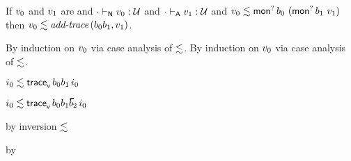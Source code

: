 \begin{lemma}\label{A-moptmopt-bnd}
  If\/ $v_0$ and\/ $v_1$ are \reducedsurfaceexpressions{}
  and\/ ${\cdot} \vdash_{\mathsf{N}} v_0 : {\mathcal U}$
  and\/ ${\cdot} \vdash_{\mathsf{A}} v_1 : {\mathcal U}$
  and\/ $v_0 \lesssim \mathsf{mon}^{?}\,b_0~(\mathsf{mon}^{?}\,b_1~v_1)$
  then\/ $v_0 \lesssim \textit{add\textsf{-}trace}\,(b_0  b_1, v_1)$.
\end{lemma}{
  \newcommand{\shortpf}{By induction on $\svalue_0$ via case analysis of $\srexpr$.}
\begin{lamportproof*}
  \shortpf
\mainproof
  \shortpf

    \begin{pfproof}
      \qedstep
        \begin{pfproof}
          $i_0 \lesssim \mathsf{trace}_{\mathsf{v}}^{}\,b_0  b_1\,i_0$
        \end{pfproof}
    \end{pfproof}

    \begin{pfproof}
      \qedstep
        \begin{pfproof}
          $\rexpr{\sint_0}{\ehist{\fconcat{\sbnd_0}{\fconcat{\sbnd_1}{\sblist_2}}}{\sint_0}}$
        \end{pfproof}
    \end{pfproof}

    \begin{pfproof}
        \begin{pfproof}
          by inversion $\lesssim$
        \end{pfproof}
        \begin{pfproof}
          by \pfih
        \end{pfproof}
      \qedstep
    \end{pfproof}


\end{lamportproof*}}
